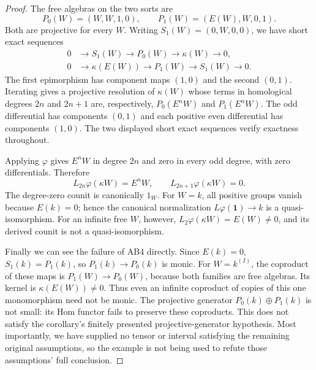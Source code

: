 \begin{proof}
The free algebras on the two sorts are
\[
 P_0(W)=(W,W,1,0),\qquad
 P_1(W)=(E(W),W,0,1).
\]
Both are projective for every $W$. Writing $S_1(W)=(0,W,0,0)$, we have short exact sequences
\[
 \begin{aligned}
 0&\longrightarrow S_1(W)\longrightarrow P_0(W)
      \longrightarrow\kappa(W)\longrightarrow0,\\
 0&\longrightarrow\kappa(E(W))\longrightarrow P_1(W)
      \longrightarrow S_1(W)\longrightarrow0.
 \end{aligned}
\]
The first epimorphism has component maps $(1,0)$ and the second $(0,1)$. Iterating gives a projective resolution of $\kappa(W)$ whose terms in homological degrees $2n$ and $2n+1$ are, respectively, $P_0(E^nW)$ and $P_1(E^nW)$. The odd differential has components $(0,1)$ and each positive even differential has components $(1,0)$. The two displayed short exact sequences verify exactness throughout.

Applying $\varphi$ gives $E^nW$ in degree $2n$ and zero in every odd degree, with zero differentials. Therefore
\[
 L_{2n}\varphi(\kappa W)=E^nW,
 \qquad L_{2n+1}\varphi(\kappa W)=0.
\]
The degree-zero counit is canonically $1_W$. For $W=k$, all positive groups vanish because $E(k)=0$; hence the canonical normalization $L\varphi(\mathbf1)\to k$ is a quasi-isomorphism. For an infinite free $W$, however, $L_2\varphi(\kappa W)=E(W)\ne0$, and its derived counit is not a quasi-isomorphism.

Finally we can see the failure of AB4 directly. Since $E(k)=0$, $S_1(k)=P_1(k)$, so $P_1(k)\to P_0(k)$ is monic. For $W=k^{(I)}$, the coproduct of these maps is $P_1(W)\to P_0(W)$, because both families are free algebras. Its kernel is $\kappa(E(W))\ne0$. Thus even an infinite coproduct of copies of this one monomorphism need not be monic. The projective generator $P_0(k)\oplus P_1(k)$ is not small: its Hom functor fails to preserve these coproducts. This does not satisfy the corollary's finitely presented projective-generator hypothesis. Most importantly, we have supplied no tensor or interval satisfying the remaining original assumptions, so the example is not being used to refute those assumptions' full conclusion.
\end{proof}
